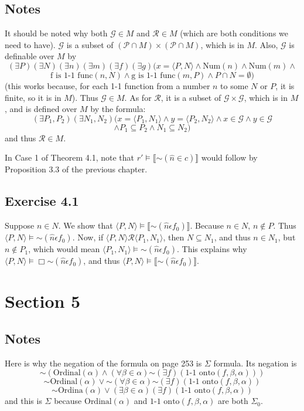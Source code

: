 \documentclass{article}
\newcommand*{\oldneg}{\mathord{\sim}}
\newcommand{\lbc}{\llbracket}
\newcommand{\rbc}{\rrbracket}
\theoremstyle{definition}
\begin{document}
\subsection*{Notes}
It should be noted why both $\mathcal{G}\in M$ and $\mathcal{R}\in M$ (which are both conditions we need to have).
$\mathcal{G}$ is a subset of $(\mathcal{P}\cap M)\times(\mathcal{P}\cap M)$, which is in $M$. Also, 
$\mathcal{G}$ is definable over $M$ by
\[ (\exists P)(\exists N)(\exists n)(\exists m)(\exists f)(\exists g)(x=\langle P,N\rangle\wedge \textrm{Num}(n)\wedge\textrm{Num}(m)\wedge \]
\[ \textrm{f is 1-1 func}(n,N)\wedge\textrm{g is 1-1 func}(m,P)\wedge P\cap N=\emptyset) \]
(this works because, for each 1-1 function from a number $n$ to some $N$ or $P$, it is finite, so it 
is in $M$). Thus $\mathcal{G}\in M$. As for $\mathcal{R}$, it is a subset of 
$\mathcal{G}\times\mathcal{G}$, which is in $M$, and is defined over $M$ by the formula:
\[ (\exists P_1,P_2)(\exists N_1,N_2)(x=\langle P_1,N_1\rangle\wedge y=\langle P_2,N_2\rangle\wedge x\in\mathcal{G}\wedge y\in\mathcal{G} \]
\[ \wedge P_1\subseteq P_2\wedge N_1\subseteq N_2) \]
and thus $\mathcal{R}\in M$.

In Case 1 of Theorem 4.1, note that $r'\vDash\lbc\oldneg (\hat{n}\in\hat{c})\rbc$ would follow by Proposition 3.3 of the previous chapter.

\subsection*{Exercise 4.1}
Suppose $n\in N$. We show that $\langle P,N\rangle\vDash\lbc\oldneg(\hat{n}\epsilon f_0)\rbc$. 
Because $n\in N$, $n\notin P$. Thus $\langle P,N\rangle\vDash\oldneg(\hat{n}\epsilon f_0)$. Now, if 
$\langle P,N\rangle\mathcal{R}\langle P_1,N_1\rangle$, then $N\subseteq N_1$, and thus $n\in N_1$, but 
$n\notin P_1$, which would mean $\langle P_1,N_1\rangle\vDash\oldneg(\hat{n}\epsilon f_0)$. This explains 
why $\langle P,N\rangle\vDash\Box\oldneg(\hat{n}\epsilon f_0)$, and thus 
$\langle P,N\rangle\vDash\lbc\oldneg(\hat{n}\epsilon f_0)\rbc$. 

\section*{Section 5}

\subsection*{Notes}
Here is why the negation of the formula on page 253 is $\Sigma$ formula. Its negation is
\[ \oldneg(\textrm{Ordinal}(\alpha)\wedge(\forall\beta\in\alpha)\oldneg(\exists f)(\textrm{1-1 onto}(f,\beta,\alpha))) \]
\[ \oldneg\textrm{Ordinal}(\alpha)\vee\oldneg(\forall\beta\in\alpha)\oldneg(\exists f)(\textrm{1-1 onto}(f,\beta,\alpha)) \]
\[ \oldneg\textrm{Ordina}(\alpha)\vee(\exists\beta\in\alpha)(\exists f)(\textrm{1-1 onto}(f,\beta,\alpha)) \]
and this is $\Sigma$ because $\textrm{Ordinal}(\alpha)$ and $\textrm{1-1 onto}(f,\beta,\alpha)$ are both $\Sigma_0$.
\end{document}
